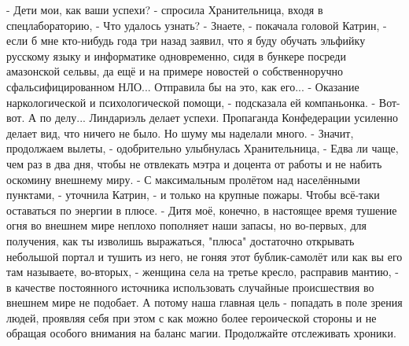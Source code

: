  - Дети мои, как ваши успехи? - спросила Хранительница, входя в спецлабораторию, - Что удалось узнать?
 - Знаете, - покачала головой Катрин, - если б мне кто-нибудь года три назад заявил, что я буду обучать эльфийку русскому языку и информатике одновременно, сидя в бункере посреди амазонской сельвы, да ещё и на примере новостей о собственноручно сфальсифицированном НЛО... Отправила бы на это, как его...
 - Оказание наркологической и психологической помощи, - подсказала ей компаньонка.
 - Вот-вот. А по делу... Линдариэль делает успехи. Пропаганда Конфедерации усиленно делает вид, что ничего не было. Но шуму мы наделали много.
 - Значит, продолжаем вылеты, - одобрительно улыбнулась Хранительница, -  Едва ли чаще, чем раз в два дня, чтобы не отвлекать мэтра и доцента от работы и не набить оскомину внешнему миру.
 - С максимальным пролётом над населёнными пунктами, - уточнила Катрин, - и только на крупные пожары. Чтобы всё-таки оставаться по энергии в плюсе.
 - Дитя моё, конечно, в настоящее время тушение огня во внешнем мире неплохо пополняет наши запасы, но во-первых, для получения, как ты изволишь выражаться, "плюса" достаточно открывать небольшой портал и тушить из него, не гоняя этот бублик-самолёт или как вы его там называете, во-вторых, - женщина села на третье кресло, расправив мантию, - в качестве постоянного источника использовать случайные происшествия во внешнем мире не подобает. А потому наша главная цель - попадать в поле зрения людей, проявляя себя при этом с как можно более героической стороны и не обращая особого внимания на баланс магии. Продолжайте отслеживать хроники.


